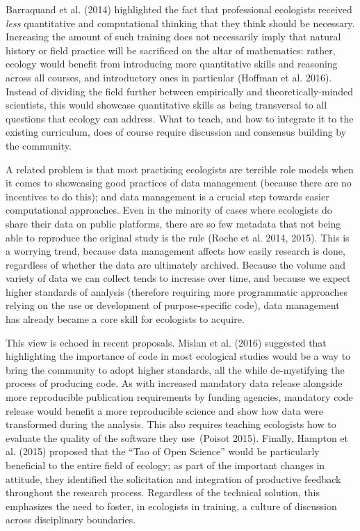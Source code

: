 \documentclass[12pt]{article}
\begin{document}
Barraquand et al. (2014) highlighted the fact that professional
ecologists received \emph{less} quantitative and computational thinking
that they think should be necessary. Increasing the amount of such
training does not necessarily imply that natural history or field
practice will be sacrificed on the altar of mathematics: rather, ecology
would benefit from introducing more quantitative skills and reasoning
across all courses, and introductory ones in particular (Hoffman et al.
2016). Instead of dividing the field further between empirically and
theoretically-minded scientists, this would showcase quantitative skills
as being transversal to all questions that ecology can address. What to
teach, and how to integrate it to the existing curriculum, does of
course require discussion and consensus building by the community.

A related problem is that most practising ecologists are terrible role
models when it comes to showcasing good practices of data management
(because there are no incentives to do this); and data management is a
crucial step towards easier computational approaches. Even in the
minority of cases where ecologists do share their data on public
platforms, there are so few metadata that not being able to reproduce
the original study is the rule (Roche et al. 2014, 2015). This is a
worrying trend, because data management affects how easily research is
done, regardless of whether the data are ultimately archived. Because
the volume and variety of data we can collect tends to increase over
time, and because we expect higher standards of analysis (therefore
requiring more programmatic approaches relying on the use or development
of purpose-specific code), data management has already became a core
skill for ecologists to acquire.

This view is echoed in recent proposals. Mislan et al. (2016) suggested
that highlighting the importance of code in most ecological studies
would be a way to bring the community to adopt higher standards, all the
while de-mystifying the process of producing code. As with increased
mandatory data release alongside more reproducible publication
requirements by funding agencies, mandatory code release would benefit a
more reproducible science and show how data were transformed during the
analysis. This also requires teaching ecologists how to evaluate the
quality of the software they use~(Poisot 2015). Finally, Hampton et al.
(2015) proposed that the \enquote{Tao of Open Science} would be
particularly beneficial to the entire field of ecology; as part of the
important changes in attitude, they identified the solicitation and
integration of productive feedback throughout the research process.
Regardless of the technical solution, this emphasizes the need to
foster, in ecologists in training, a culture of discussion across
disciplinary boundaries.
\end{document}
